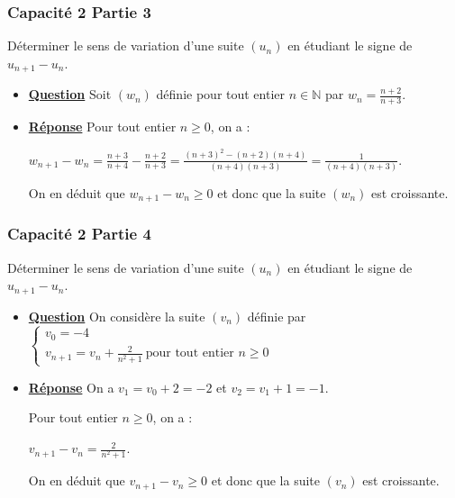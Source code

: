 \documentclass[11pt, hyperref={urlcolor=red,%
            linkcolor=blue, %
            colorlinks=true}]{beamer}
\newcommand{\N}{\mathbb{N}}
\newcommand{\suite}[1]{\ensuremath{\left(#1_{n}\right)}}
\begin{document}
\begin{frame}
\frametitle{Capacité 2 Partie 3}


Déterminer le sens de variation d'une suite $\suite{u}$ en étudiant le signe de $u_{n+1}-u_{n}$.

\begin{itemize}
	\item  \underline{\textbf{Question}}  Soit   $\suite{w}$ définie pour tout entier $n \in \N$ par $w_{n}=\frac{n+2}{n+3}$.

	
\pause 	\item \underline{\textbf{Réponse}} Pour tout entier $n \geqslant 0$, on a : 

$w_{n+1}-w_{n}=\frac{n+3}{n+4}-\frac{n+2}{n+3}=\frac{(n+3)^{2}-(n+2)(n+4)}{(n+4)(n+3)}=\frac{1}{(n+4)(n+3)}$.

On en déduit que $w_{n+1}-w_{n} \geqslant 0$ et donc que la suite $\suite{w}$ est croissante.



\end{itemize}


\end{frame}




\begin{frame}
\frametitle{Capacité 2 Partie 4}


Déterminer le sens de variation d'une suite $\suite{u}$ en étudiant le signe de $u_{n+1}-u_{n}$.

\begin{itemize}
	\item  \underline{\textbf{Question}} On considère la suite $\suite{v}$ définie par 
$
\begin{cases}
	v_{0}= -4\\
	v_{n+1}=v_{n}+\frac{2}{n^2+1} \: \text{pour tout entier } n \geqslant 0
 \end{cases}
$

	
\pause 	\item \underline{\textbf{Réponse}} On a $v_{1}=v_{0}+2=-2$ et $v_{2}=v_{1}+1=-1 $. 


Pour tout entier $n \geqslant 0$, on a : 

$v_{n+1}-v_{n}=\frac{2}{n^2+1}$.

On en déduit que $v_{n+1}-v_{n} \geqslant 0$ et donc que la suite $\suite{v}$ est croissante.



\end{itemize}


\end{frame}
\end{document}
